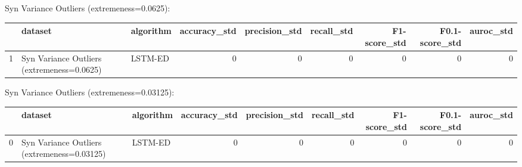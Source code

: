 Syn Variance Outliers (extremeness=0.0625):

\begin{tabular}{rllrrrrrr}
\hline
    & dataset                                    & algorithm   &   accuracy\_std &   precision\_std &   recall\_std &   F1-score\_std &   F0.1-score\_std &   auroc\_std \\
\hline
  1 & Syn Variance Outliers (extremeness=0.0625) & LSTM-ED     &              0 &               0 &            0 &              0 &                0 &           0 \\
\hline
\end{tabular}

Syn Variance Outliers (extremeness=0.03125):

\begin{tabular}{rllrrrrrr}
\hline
    & dataset                                     & algorithm   &   accuracy\_std &   precision\_std &   recall\_std &   F1-score\_std &   F0.1-score\_std &   auroc\_std \\
\hline
  0 & Syn Variance Outliers (extremeness=0.03125) & LSTM-ED     &              0 &               0 &            0 &              0 &                0 &           0 \\
\hline
\end{tabular}

